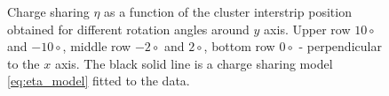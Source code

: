 \begin{figure}[tbph]
\begin{center}
\caption{Charge sharing $\eta$ as a function of the cluster interstrip position obtained for different rotation angles around $y$ axis. Upper row $10\circ$ and $-10\circ$, middle row $-2 \circ$ and $2 \circ$, bottom row $0\circ$ - perpendicular to the $x$ axis. The black solid line is a charge sharing model \ref{eq:eta_model} fitted to the data. }
\label{fig:eta_fit}
 \end{center}
 \end{figure}